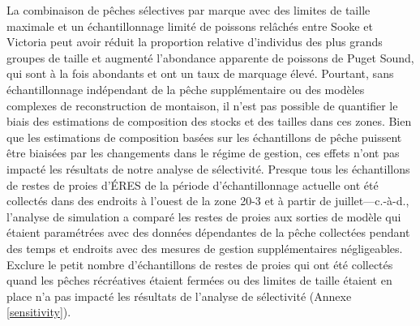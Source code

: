 La combinaison de pêches sélectives par marque avec des limites de taille maximale et un échantillonnage limité de poissons relâchés entre Sooke et Victoria peut avoir réduit la proportion relative d'individus des plus grands groupes de taille et augmenté l'abondance apparente de poissons de Puget Sound, qui sont à la fois abondants et ont un taux de marquage élevé. Pourtant, sans échantillonnage indépendant de la pêche supplémentaire ou des modèles complexes de reconstruction de montaison, il n'est pas possible de quantifier le biais des estimations de composition des stocks et des tailles dans ces zones. Bien que les estimations de composition basées sur les échantillons de pêche puissent être biaisées par les changements dans le régime de gestion, ces effets n'ont pas impacté les résultats de notre analyse de sélectivité. Presque tous les échantillons de restes de proies d'ÉRES de la période d'échantillonnage actuelle ont été collectés dans des endroits à l'ouest de la zone 20-3 et à partir de juillet---c.-à-d., l'analyse de simulation a comparé les restes de proies aux sorties de modèle qui étaient paramétrées avec des données dépendantes de la pêche collectées pendant des temps et endroits avec des mesures de gestion supplémentaires négligeables. Exclure le petit nombre d'échantillons de restes de proies qui ont été collectés quand les pêches récréatives étaient fermées ou des limites de taille étaient en place n'a pas impacté les résultats de l'analyse de sélectivité (Annexe \ref{sensitivity}).


